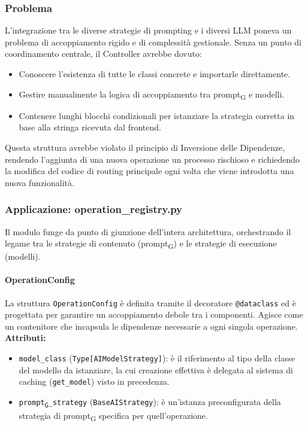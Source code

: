 \documentclass[11pt,a4paper]{article}
\newcommand{\gls}[1]{#1\textsubscript{G}}
\begin{document}
\subsubsection{Problema}
L’integrazione tra le diverse strategie di prompting e i diversi LLM poneva un problema di accoppiamento rigido e di complessità gestionale. Senza un punto di coordinamento centrale, il Controller avrebbe dovuto:
\begin{itemize}
    \item Conoscere l'esistenza di tutte le classi concrete e importarle direttamente.
    \item Gestire manualmente la logica di accoppiamento tra \gls{prompt} e modelli.
    \item Contenere lunghi blocchi condizionali per istanziare la strategia corretta in base alla stringa ricevuta dal frontend.
\end{itemize}
Questa struttura avrebbe violato il principio di Inversione delle Dipendenze, rendendo l'aggiunta di una nuova operazione un processo rischioso e richiedendo la modifica del codice di routing principale ogni volta che viene introdotta una nuova funzionalità.

\subsubsection{Applicazione: operation\_registry.py}
Il modulo funge da punto di giunzione dell'intera architettura, orchestrando il legame tra le strategie di contenuto (\gls{prompt}) e le strategie di esecuzione (modelli).

\paragraph{OperationConfig} 
La struttura \texttt{OperationConfig} è definita tramite il decoratore \texttt{@dataclass} ed è progettata per garantire un accoppiamento debole tra i componenti. Agisce come un contenitore che incapsula le dipendenze necessarie a ogni singola operazione.\\
\textbf{Attributi:}
\begin{itemize}
    \item \texttt{model\_class} (\texttt{Type[AIModelStrategy]}): è il riferimento al tipo della classe del modello da istanziare, la cui creazione effettiva è delegata al sistema di caching (\texttt{get\_model}) visto in precedenza.
    \item \texttt{\gls{prompt}\_strategy} (\texttt{BaseAIStrategy}): è un'istanza preconfigurata della strategia di \gls{prompt} specifica per quell'operazione.
\end{itemize}
\end{document}
